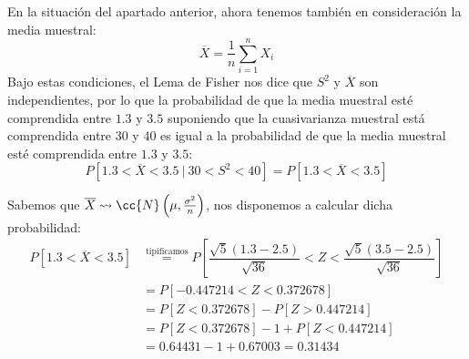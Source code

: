 \begin{ejercicio}
\begin{enumerate}[label=\alph*)]
            En la situación del apartado anterior, ahora tenemos también en consideración la media muestral:
            \begin{equation*}
                \overline{X} = \dfrac{1}{n}\sum_{i=1}^n X_i
            \end{equation*} 
            Bajo estas condiciones, el Lema de Fisher nos dice que $S^2$ y $\overline{X}$ son independientes, por lo que la probabilidad de que la media muestral esté comprendida entre $1.3$ y $3.5$ suponiendo que la cuasivarianza muestral está comprendida entre $30$ y $40$ es igual a la probabilidad de que la media muestral esté comprendida entre $1.3$ y $3.5$:
            \begin{equation*}
                P[1.3<\overline{X}<3.5\ |\ 30 < S^2 < 40] = P[1.3<\overline{X}<3.5]
            \end{equation*}

            Sabemos que $\overline{X}\rightsquigarrow\cc{N}\left(\mu, \frac{\sigma^2}{n}\right)$, nos disponemos a calcular dicha probabilidad:
            \begin{align*}
                P[1.3<\overline{X}<3.5] &\stackrel{\text{tipificamos}}{=} P\left[\dfrac{\sqrt{5}(1.3-2.5)}{\sqrt{36}}< Z < \dfrac{\sqrt{5}(3.5-2.5)}{\sqrt{36}}\right] \\
                                        &= P[-0.447214 < Z < 0.372678] \\ 
                                        &= P[Z<0.372678] - P[Z>0.447214] \\
                                        &= P[Z<0.372678] -1 + P[Z<0.447214] \\
                                        &= 0.64431 - 1 + 0.67003 = 0.31434
            \end{align*}
    \end{enumerate}
\end{ejercicio}

